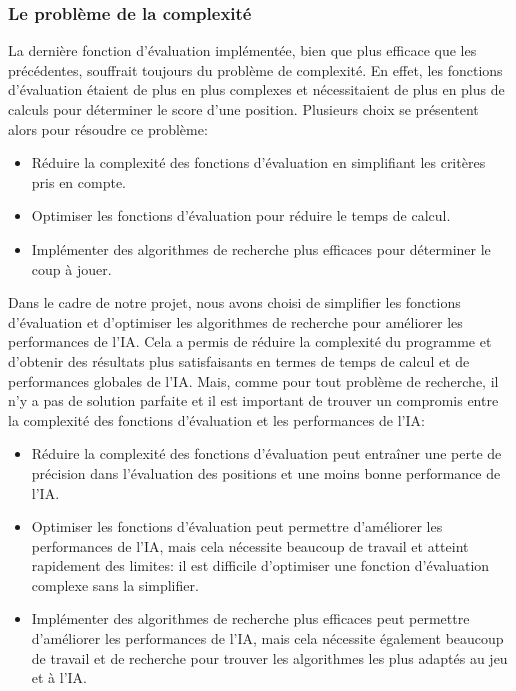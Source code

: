 \subsubsection{Le problème de la complexité}
La dernière fonction d'évaluation implémentée, bien que plus efficace que les précédentes, souffrait toujours du problème
de complexité. En effet, les fonctions d'évaluation étaient de plus en plus complexes et nécessitaient de plus en plus de
calculs pour déterminer le score d'une position. Plusieurs choix se présentent alors pour résoudre ce problème:
\begin{itemize}
    \item Réduire la complexité des fonctions d'évaluation en simplifiant les critères pris en compte.
    \item Optimiser les fonctions d'évaluation pour réduire le temps de calcul.
    \item Implémenter des algorithmes de recherche plus efficaces pour déterminer le coup à jouer.
\end{itemize}
Dans le cadre de notre projet, nous avons choisi de simplifier les fonctions d'évaluation et d'optimiser les algorithmes
de recherche pour améliorer les performances de l'IA.\@
Cela a permis de réduire la complexité du programme et d'obtenir des résultats plus satisfaisants en termes de temps de 
calcul et de performances globales de l'IA.\@
Mais, comme pour tout problème de recherche, il n'y a pas de solution parfaite et il est important 
de trouver un compromis entre la complexité des fonctions d'évaluation et les performances de l'IA:\@
\begin{itemize}
    \item Réduire la complexité des fonctions d'évaluation peut entraîner une perte de précision dans l'évaluation des positions
    et une moins bonne performance de l'IA.\@
    \item Optimiser les fonctions d'évaluation peut permettre d'améliorer les performances de l'IA, mais cela nécessite
    beaucoup de travail et atteint rapidement des limites: il est difficile d'optimiser une fonction d'évaluation
    complexe sans la simplifier.\@
    \item Implémenter des algorithmes de recherche plus efficaces peut permettre d'améliorer les performances de l'IA,
    mais cela nécessite également beaucoup de travail et de recherche pour trouver les algorithmes les plus adaptés
    au jeu et à l'IA.\@
\end{itemize}


